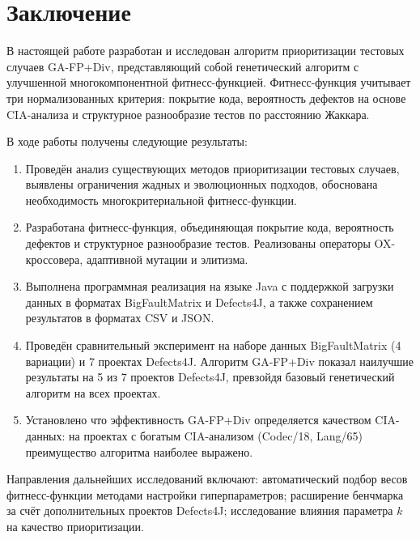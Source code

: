 \chapter*{Заключение}

В настоящей работе разработан и исследован алгоритм приоритизации тестовых случаев GA-FP+Div, 
представляющий собой генетический алгоритм с улучшенной многокомпонентной фитнесс-функцией. 
Фитнесс-функция учитывает три нормализованных критерия: покрытие кода, вероятность дефектов на основе 
CIA-анализа и структурное разнообразие тестов по расстоянию Жаккара.

В ходе работы получены следующие результаты:

\begin{enumerate}
    \item Проведён анализ существующих методов приоритизации тестовых случаев, выявлены ограничения жадных 
    и эволюционных подходов, обоснована необходимость многокритериальной фитнесс-функции.

    \item Разработана фитнесс-функция, объединяющая покрытие кода, вероятность дефектов и структурное 
    разнообразие тестов. Реализованы операторы OX-кроссовера, адаптивной мутации и элитизма.

    \item Выполнена программная реализация на языке Java с поддержкой загрузки данных в форматах 
    BigFaultMatrix и Defects4J, а также сохранением результатов в форматах CSV и JSON.

    \item Проведён сравнительный эксперимент на наборе данных BigFaultMatrix (4 вариации) и 7 проектах 
    Defects4J. Алгоритм GA-FP+Div показал наилучшие результаты на 5 из 7 проектов Defects4J, 
    превзойдя базовый генетический алгоритм на всех проектах.

    \item Установлено что эффективность GA-FP+Div определяется качеством CIA-данных: на проектах с 
    богатым CIA-анализом (Codec/18, Lang/65) преимущество алгоритма наиболее выражено.
\end{enumerate}

Направления дальнейших исследований включают: автоматический подбор весов фитнесс-функции методами 
настройки гиперпараметров; расширение бенчмарка за счёт дополнительных проектов Defects4J; исследование 
влияния параметра $k$ на качество приоритизации.